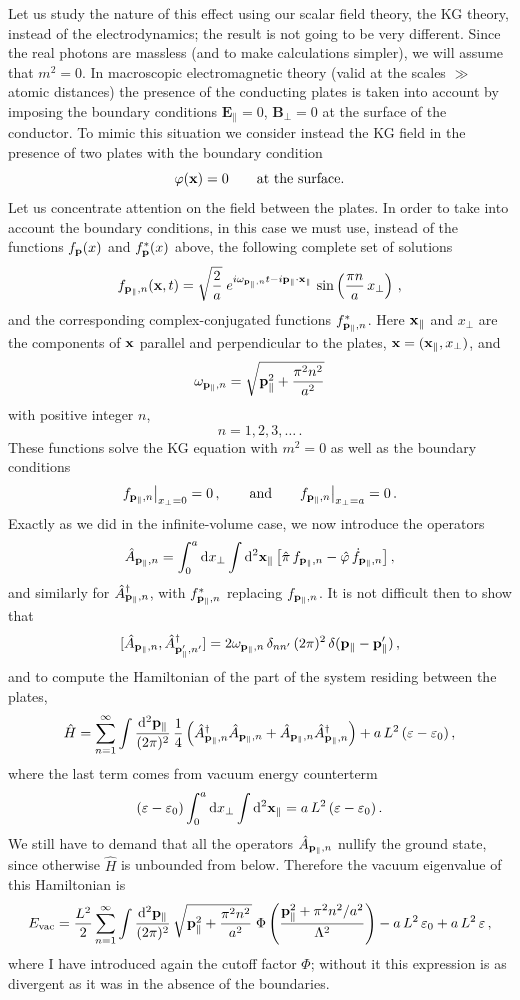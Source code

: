 Let us study the nature of this effect using our scalar field theory, the KG
theory, instead of the electrodynamics; the result is not going to be very
different. Since the real photons are massless (and to make calculations
simpler), we will assume that $m^2=0$. In macroscopic electromagnetic theory
(valid at the scales $\gg$ atomic distances) the presence of the conducting
plates is taken into account by imposing the boundary conditions
$\mathbf{E}_\parallel=0$, $\mathbf{B}_\perp=0$ at the surface of the conductor.
To mimic this situation we consider instead the KG field in the presence of
two plates with the boundary condition
\[
\varphi(\mathbf{x})=0\qquad\text{at the surface.}
\]
Let us concentrate attention on the field between the plates. In order to
take into account the boundary conditions, in this case we must use, instead
of the functions $f_{\mathbf{p}}(x)$ and $f^*_{\mathbf{p}}(x)$ above, the following complete set
of solutions
\[
f_{\mathbf{p}_\parallel,n}(\mathbf{x},t)=\sqrt{\frac2a}\;e^{i\omega_{\mathbf{p}_\parallel,n}t-i\mathbf{p}_\parallel\cdot\mathbf{x}_\parallel}\,
\sin\left(\frac{\pi n}{a}\,x_\perp\right)\,,
\]
and the corresponding complex-conjugated functions $f^*_{\mathbf{p}_\parallel,n}$.
Here $\mathbf{x}_\parallel$ and $x_\perp$ are the components of $\mathbf{x}$ parallel and
perpendicular to the plates, $\mathbf{x}=(\mathbf{x}_\parallel,x_\perp)$, and
\[
\omega_{\mathbf{p}_\parallel,n}=\sqrt{\mathbf{p}_\parallel^2+\frac{\pi^2n^2}{a^2}}
\]
with positive integer $n$,
\[
n=1,2,3,\dots\,.
\]
These functions solve the KG equation with $m^2=0$ as well as the boundary
conditions
\[
f_{\mathbf{p}_\parallel,n}\big|_{x_\perp=0}=0\,,\qquad\text{and}\qquad
f_{\mathbf{p}_\parallel,n}\big|_{x_\perp=a}=0\,.
\]
Exactly as we did in the infinite-volume case, we now introduce the operators
\[
\hat A_{\mathbf{p}_\parallel,n}=\int_0^a \mathop{}\!\mathrm{d} x_\perp\int \mathop{}\!\mathrm{d}^2\mathbf{x}_\parallel\,
\bigl[\hat\pi\,f_{\mathbf{p}_\parallel,n}-\hat\varphi\,\dot f_{\mathbf{p}_\parallel,n}\bigr]\,,
\]
and similarly for $\hat A^\dagger_{\mathbf{p}_\parallel,n}$, with
$f^*_{\mathbf{p}_\parallel,n}$ replacing $f_{\mathbf{p}_\parallel,n}$. It is not difficult
then to show that
\[
[\hat A_{\mathbf{p}_\parallel,n},\hat A^\dagger_{\mathbf{p}'_\parallel,n'}]
=2\omega_{\mathbf{p}_\parallel,n}\,\delta_{nn'}\,(2\pi)^2\,\delta(\mathbf{p}_\parallel-\mathbf{p}'_\parallel)\,,
\]
and to compute the Hamiltonian of the part of the system residing between the
plates,
\[
\hat H=\sum_{n=1}^\infty\int\frac{\mathop{}\!\mathrm{d}^2\mathbf{p}_\parallel}{(2\pi)^2}\,\frac14\,
\Bigl(\hat A^\dagger_{\mathbf{p}_\parallel,n}\hat A_{\mathbf{p}_\parallel,n}+\hat A_{\mathbf{p}_\parallel,n}\hat A^\dagger_{\mathbf{p}_\parallel,n}\Bigr)
+a\,L^2\,(\varepsilon-\varepsilon_0)\,,
\]
where the last term comes from vacuum energy counterterm
\[
(\varepsilon-\varepsilon_0)\int_0^a \mathop{}\!\mathrm{d} x_\perp\int \mathop{}\!\mathrm{d}^2\mathbf{x}_\parallel=a\,L^2\,(\varepsilon-\varepsilon_0)\,.
\]
We still have to demand that all the operators $\hat A_{\mathbf{p}_\parallel,n}$
nullify the ground state, since otherwise $\hat H$ is unbounded from below.
Therefore the vacuum eigenvalue of this Hamiltonian is
\[
E_{\text{vac}}=\frac{L^2}{2}\sum_{n=1}^\infty\int\frac{\mathop{}\!\mathrm{d}^2\mathbf{p}_\parallel}{(2\pi)^2}\,
\sqrt{\mathbf{p}_\parallel^2+\frac{\pi^2n^2}{a^2}}\;\Phi\left(\frac{\mathbf{p}_\parallel^2+\pi^2n^2/a^2}{\Lambda^2}\right)
-a\,L^2\,\varepsilon_0+a\,L^2\,\varepsilon\,,
\]
where I have introduced again the cutoff factor $\Phi$; without it this
expression is as divergent as it was in the absence of the boundaries.

